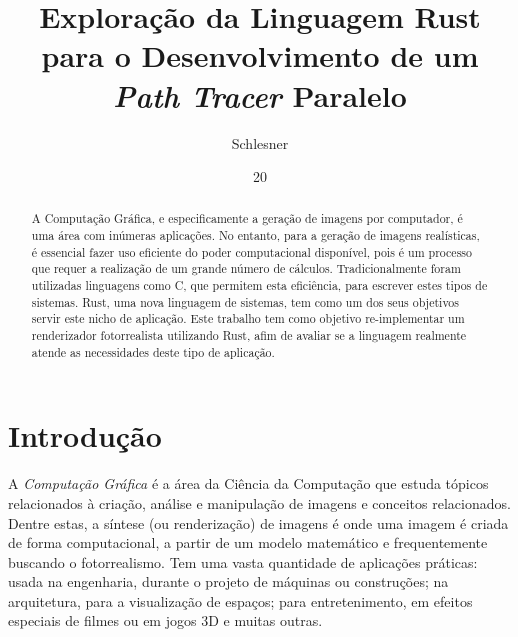 \documentclass[tg]{mdtufsm}
\title{Exploração da Linguagem Rust para o Desenvolvimento de um \emph{Path Tracer} Paralelo}
\author{Schlesner}{Yuri Kunde}
\institute{Centro de Tecnologia}
\date{20}{Outubro}{2014}
\def\Cpp{{C\nolinebreak[4]\raisebox{.20ex}{\small\bf++}}}
\begin{document}
\maketitle
\makeapprove

\begin{abstract}
A Computação Gráfica, e especificamente a geração de imagens por computador, é uma área com
inúmeras aplicações. No entanto, para a geração de imagens realísticas, é essencial fazer
uso eficiente do poder computacional disponível, pois é um processo que requer a realização
de um grande número de cálculos. Tradicionalmente foram utilizadas linguagens como \Cpp, que
permitem esta eficiência, para escrever estes tipos de sistemas. Rust, uma nova
linguagem de sistemas, tem como um dos seus objetivos servir este nicho de aplicação. Este
trabalho tem como objetivo re-implementar um renderizador fotorrealista utilizando Rust,
afim de avaliar se a linguagem realmente atende as necessidades deste tipo de aplicação.
\end{abstract}

\tableofcontents
\listoffigures
\listoftables

\setlength{\baselineskip}{1.5\baselineskip}


\chapter{Introdução}

A \emph{Computação Gráfica} é a área da Ciência da Computação que estuda tópicos relacionados à
criação, análise e manipulação de imagens e conceitos relacionados. Dentre estas, a síntese (ou
renderização) de imagens é onde uma imagem é criada de forma computacional, a partir de um modelo
matemático e frequentemente buscando o fotorrealismo. Tem uma vasta quantidade de aplicações
práticas: usada na engenharia, durante o projeto de máquinas ou construções; na arquitetura, para
a visualização de espaços; para entretenimento, em efeitos especiais de filmes ou em jogos 3D e
muitas outras.
\end{document}
